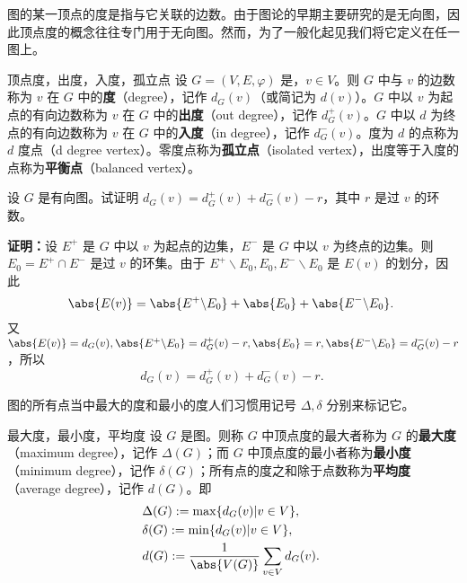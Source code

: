 

\cite{graph2}图的某一顶点的度是指与它关联的边数。由于图论的早期主要研究的是无向图，因此顶点度的概念往往专门用于无向图。然而，为了一般化起见我们将它定义在任一图上。

\begin{definition}{顶点度，出度，入度，孤立点}
设 $G=(V,E,\varphi)$ 是，$v\in V$。则 $G$ 中与 $v$ 的边数称为 $v$ 在 $G$ 中的\textbf{度}（degree），记作 $d_G(v)$（或简记为 $d(v)$）。$G$ 中以 $v$ 为起点的有向边数称为 $v$ 在 $G$ 中的\textbf{出度}（out degree），记作 $d_G^+(v)$。$G$ 中以 $d$ 为终点的有向边数称为 $v$ 在 $G$ 中的\textbf{入度}（in degree），记作 $d_G^-(v)$。度为 $d$ 的点称为 $d$ 度点（d degree vertex）。零度点称为\textbf{孤立点}（isolated vertex），出度等于入度的点称为\textbf{平衡点}（balanced vertex）。
\end{definition}

\begin{example}{}
设 $G$ 是有向图。试证明 $d_G(v)=d_G^+(v)+d_G^-(v)-r$，其中 $r$ 是过 $v$ 的环数。

\textbf{证明：}设 $E^+$ 是 $G$ 中以 $v$ 为起点的边集，$E^-$ 是 $G$ 中以 $v$ 为终点的边集。则 $E_0=E^+\cap E^-$ 是过 $v$ 的环集。由于
$E^+\backslash E_0, E_0, E^-\backslash E_0$ 是 $E(v)$ 的划分，因此
\begin{equation}
\abs{E(v)}=\abs{E^+\backslash E_0}+\abs{E_0}+\abs{E^-\backslash E_0}.~
\end{equation}
又 $\abs{E(v)}=d_G(v),\abs{E^+\backslash E_0}=d_G^+(v)-r, \abs{E_0}=r, \abs{E^-\backslash E_0}=d_G^-(v)-r$，所以
\begin{equation}
d_G(v)=d_G^+(v)+d_G^-(v)-r.~
\end{equation}
\end{example}
图的所有点当中最大的度和最小的度人们习惯用记号 $\Delta,\delta$ 分别来标记它。
\begin{definition}{最大度，最小度，平均度}
设 $G$ 是图。则称 $G$ 中顶点度的最大者称为 $G$ 的\textbf{最大度}（maximum degree），记作 $\Delta(G)$；而 $G$ 中顶点度的最小者称为\textbf{最小度}（minimum degree），记作 $\delta(G)$；所有点的度之和除于点数称为\textbf{平均度}（average degree），记作 $d(G)$。即
\begin{equation}\label{eq_DGraph_2}
\begin{aligned}
&\Delta(G):=\max\{d_G(v)|v\in V\}, \\
&\delta(G):=\min\{d_G(v)|v\in V\},\\
&d(G):=\frac{1}{\abs{V(G)}}\sum_{v\in V}d_G(v).
\end{aligned}~
\end{equation}
\end{definition}


